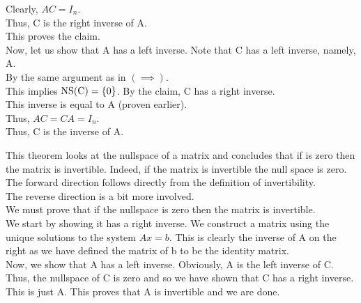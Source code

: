 \documentclass[12pt]{article}
\begin{document}
\begin{prf}{}
Clearly, \(AC = I_n\).\\
Thus, C is the right inverse of A.\\
This proves the claim.\\
Now, let us show that A has a left inverse. Note that C has a left inverse, namely, A.\\
By the same argument as in \(\left(\implies\right)\).\\
This implies \(\rm{NS}(C) = \{0\}\). By the claim, C has a right inverse.\\
This inverse is equal to A (proven earlier).\\
Thus, \(AC = CA = I_n\).\\
Thus, C is the inverse of A.
\end{prf}
\begin{explanation}{}
    This theorem looks at the nullspace of a matrix and concludes that if is zero then the matrix is invertible. Indeed, if the matrix is invertible the null space is zero.\\
The forward direction follows directly from the definition of invertibility.\\
The reverse direction is a bit more involved.\\
We must prove that if the nullspace is zero then the matrix is invertible.\\
We start by showing it has a right inverse. We construct a matrix using the unique solutions to the system $Ax = b$. This is clearly the inverse of A on the right as we have defined the matrix of b to be the identity matrix.\\
Now, we show that A has a left inverse. Obviously, A is the left inverse of C. Thus, the nullspace of C is zero and so we have shown that C has a right inverse. This is just A. This proves that A is invertible and we are done.\\
\end{explanation}


\newpage
\end{document}
